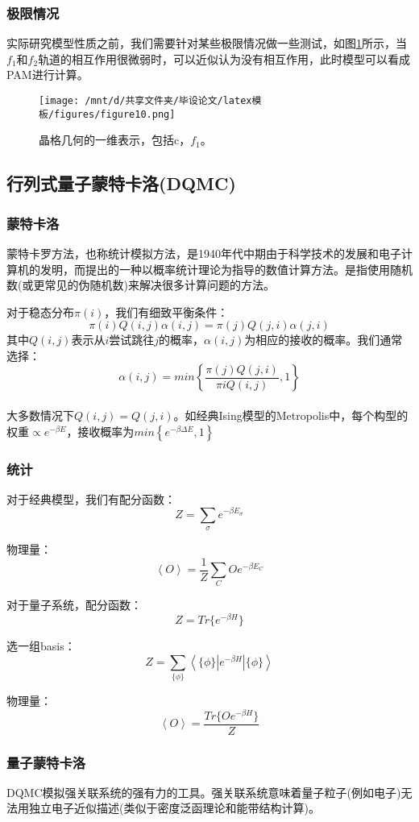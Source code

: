 \subsubsection{极限情况}
实际研究模型性质之前，我们需要针对某些极限情况做一些测试，如图\ref{fig4.1.3}所示，当$f_1$和$f_2$轨道的相互作用很微弱时，可以近似认为没有相互作用，此时模型可以看成PAM进行计算。
\begin{figure}[h]
    \texttt{[image: /mnt/d/共享文件夹/毕设论文/latex模板/figures/figure10.png]}
    \caption{晶格几何的一维表示，包括c，$f_1$。}
    \label{fig4.1.3}
\end{figure}

\subsection{行列式量子蒙特卡洛(DQMC)}%
\subsubsection{蒙特卡洛}
蒙特卡罗方法，也称统计模拟方法，是1940年代中期由于科学技术的发展和电子计算机的发明，而提出的一种以概率统计理论为指导的数值计算方法。是指使用随机数(或更常见的伪随机数)来解决很多计算问题的方法。

对于稳态分布$\pi(i)$，我们有细致平衡条件：
$$
\pi(i)Q(i,j)\alpha(i,j)=\pi(j)Q(j,i)\alpha(j,i)
$$
其中$Q(i,j)$表示从$i$尝试跳往$j$的概率，$\alpha(i,j)$为相应的接收的概率。我们通常选择：
$$
\alpha(i,j)=min\left \{\frac{\pi(j)Q(j,i)}{\pi{i}Q(i,j)},1\right \}
$$
\\大多数情况下$Q(i,j)=Q(j,i)$。如经典Ising模型的Metropolis中，每个构型的权重$\propto e^{-\beta E}$，接收概率为$min \left \{ e^{-\beta \Delta E},1 \right \}$
\subsubsection{统计}
对于经典模型，我们有配分函数：
$$
Z=\sum_\sigma e^{-\beta E_\sigma}
$$

物理量：
$$
\left \langle O \right \rangle=\frac{1}{Z} \sum_C O e^{-\beta E_C}
$$

对于量子系统，配分函数：
$$
Z=Tr\{e^{-\beta H}\}
$$

选一组basis：
$$
Z=\sum_{\{\phi \}} \left \langle \{\phi \} | e^{-\beta H}| \{\phi \} \right \rangle
$$

物理量：
$$
\left \langle O \right \rangle=\frac{Tr\{ O e^{-\beta H} \}}{Z}
$$


\subsubsection{量子蒙特卡洛}
DQMC模拟强关联系统的强有力的工具。强关联系统意味着量子粒子(例如电子)无法用独立电子近似描述(类似于密度泛函理论和能带结构计算)。

